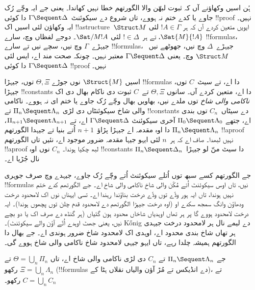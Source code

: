 \documentclass[../../../include/open-logic-section]{subfiles}
\begin{document}


ہُن اسیں وکھاؤنے آں کہ ثبوت لبھّن والا الگورتھم خطا نہیں کھاندا۔ یعنی جے ایہ وچّے رُک جاوے یا کدے ختم نہ ہووے، تاں شروع دے سیکوئنٹ~$\Gamma \Sequent \Delta$ دا کوئی !!{proof} نہیں۔ ایہ وکھاؤن لئی اسیں اک !!a{structure}~$\Struct M$ ایویں متعین کردے آں کہ ہر $!A \in \Gamma$ لئی $\Sat{M}{!A}$، تے ہر~$! \in \Delta$ لئی $\Sat/{M}{!A}$۔ دوجے لفظاں وچ، سارے !!{formula}s، جیہڑے~$\Gamma$ وچ نیں، سچے نیں تے سارے !!{formula}s، جیہڑے~$\Delta$ وچ نیں، جھوٹھے نیں~$\Struct M$ وچ۔ یعنی $\Gamma \Sequent \Delta$ معتبر نہیں۔ چونکہ  صحت مند اے، ایس لئی $\Gamma \Sequent \Delta$ دا کوئی !!{proof} نہیں۔

اسیں $\Struct{M}$ نوں جوڑے $ \Theta, \Xi$ توں، جیہڑا !!{formula}s دا اے، تے سیٹ~$C$ توں، جیہڑا !!{constant}s دا اے، متعین کردے آں۔ سانوں $\Theta, \Xi$ تے~$C$ ثبوت دی ناکام بھال دی اک \emph{ناکامی والی شاخ} توں ملدے نیں، بھاویں بھال وچّے رُک جاوے یا ختم ای نہ ہووے۔ ناکامی والی شاخ سیکوئنٹاں دی لڑی $ \Pi_n \Sequent
\Lambda_n$ تے !!{constant}s دے سیٹاں~$C_n$ توں بندی اے، جتھے $\Pi_0 \Sequent \Lambda_0$ آخری سیکوئنٹ $ \Gamma \Sequent
\Delta$ اے، تے $\Pi_{n+1} \Sequent \Lambda_{n+1}$، $ \Pi_n
\Sequent \Lambda_n$ دا اوہ مقدمہ اے جیہڑا پڑاؤ~$n+1$ اُتے بنیا تے جیہدا الگورتھم !!a{proof} نہیں لبھدا۔ صاف اے کہ ہر~$n$ لئی ایہو جیہا مقدمہ ضرور موجود اے، نئیں تاں الگورتھم !!a{proof} لبھ چکیا ہوندا۔ $C_n$ نوں اوہ !!{constant}s دا سیٹ منّ لو جیہڑا~$\Pi_n
\Sequent \Delta_n$ نال جُڑیا اے۔

جے الگورتھم کسے سبھ توں اُتلے سیکوئنٹ اُتے وچّے رُک جاوے، جیہدے وچ صرف جوہری !!{formula}s نیں، تاں اوس سیکوئنٹ اُتے مُکّن والی شاخ ناکامی والی شاخ اے۔ جے الگورتھم کدے ختم نہیں ہوندا، تاں ایہ ہور وڈّے توں وڈّے درخت بناؤندا رہندا اے۔ تسی ایہناں نوں اک لامحدود درخت ودھاؤن وانگ سمجھ سکدے او (اوہ درخت جیہڑا الگورتھم دے لامحدود قدم چلن توں پچھوں ہوندا)۔ ایہ درخت لامحدود ہووے گا پر ہر تھاں اوہدیاں شاخاں محدود ہون گئیاں (ہر گنڈھ دے صرف اک یا دو بچے نیں، یعنی جھٹ اوہدے اُتّے آؤن والے سیکوئنٹ)۔ K\H{o}nig دے لیمے نال ہر لامحدود درخت جیہدی ہر تھاں شاخ بندی محدود اے، اوہدی اک لامحدود شاخ ضرور ہوندی اے۔ جے بھال دا الگورتھم ہمیشہ چلدا رہے، تاں ایہو جیہی لامحدود شاخ ناکامی والی شاخ ہووے گی۔

جے $\Pi_n \Sequent \Lambda_n$ تے $C_n$ دی لڑی ناکامی والی شاخ اے، تاں $ \Theta = \bigcup_n \Pi_n$ تے $ \Xi = \bigcup_n \Lambda_n$ رکھو (!!{formula}s دے انڈیکس تے مُڑ آؤن والیاں نقلاں ہٹا کے)، تے $C =
\bigcup_n C_n$ رکھو۔
\end{document}
